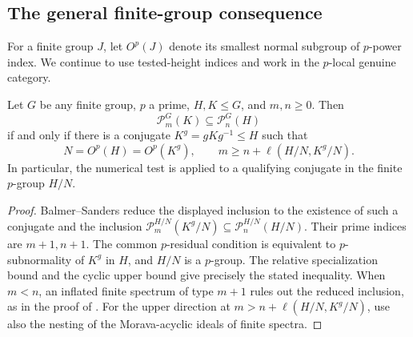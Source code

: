 \subsection{The general finite-group consequence}

For a finite group \(J\), let \(O^p(J)\) denote its smallest normal
subgroup of \(p\)-power index. We continue to use tested-height
indices and work in the \(p\)-local genuine category.

\begin{corollary}\label{cor:general-groups}
Let \(G\) be any finite group, \(p\) a prime, \(H,K\le G\), and
\(m,n\ge0\). Then
\[
 \mathcal P_m^G(K)\subseteq\mathcal P_n^G(H)
\]
if and only if there is a conjugate \(K^g=gKg^{-1}\le H\) such that
\[
 N=O^p(H)=O^p(K^g),\qquad
 m\ge n+\ell(H/N,K^g/N).
\]
In particular, the numerical test is applied to a qualifying
conjugate in the finite \(p\)-group \(H/N\).
\end{corollary}
\begin{proof}
Balmer--Sanders \cite[Proposition~6.11]{BS} reduce the displayed
inclusion to the existence of such a conjugate and the inclusion
\(\mathcal P_m^{H/N}(K^g/N)\subseteq
\mathcal P_n^{H/N}(H/N)\). Their prime indices are \(m+1,n+1\).
The common \(p\)-residual condition is equivalent to
\(p\)-subnormality of \(K^g\) in \(H\), and \(H/N\) is a
\(p\)-group. The relative specialization bound and the cyclic upper
bound give precisely the stated inequality. When \(m<n\), an
inflated finite spectrum of type \(m+1\) rules out the reduced
inclusion, as in the proof of .
For the upper direction at \(m>n+\ell(H/N,K^g/N)\), use also
the nesting of the Morava-acyclic ideals of finite spectra.
\end{proof}
